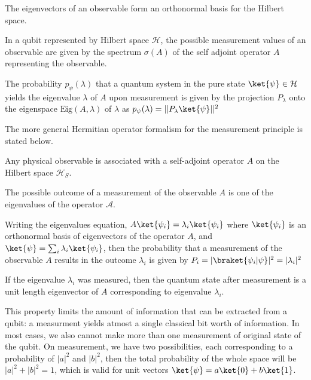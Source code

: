 \begin{lemma}
    The eigenvectors of an observable form an orthonormal basis for the Hilbert space.
\end{lemma}

\begin{lemma}
    In a qubit represented by Hilbert space $\mathcal{H}$, the possible measurement values of an observable are given by the spectrum $\sigma(A)$ of the self adjoint operator $A$ representing the observable.

    The probability $p_\psi(\lambda)$ that a quantum system in the pure state $\ket{\psi} \in \mathcal{H}$ yields the eigenvalue $\lambda$ of $A$ upon measurement is given by the projection $P_\lambda$ onto the eigenspace $\text{Eig}(A, \lambda)$ of $\lambda$ as $p_\psi(\lambda) = || P_\lambda \ket{\psi} ||^2$
\end{lemma}

The more general Hermitian operator formalism for the measurement principle is stated below.

\begin{mdframed}
\begin{axiom}
Any physical observable is associated with a self-adjoint operator $A$ on the Hilbert space $\mathcal{H}_S$. 

The possible outcome of a measurement of the observable $A$ is one of the eigenvalues of the operator $\mathcal{A}$.

Writing the eigenvalues equation, $A \ket{\psi_i} = \lambda_i \ket{\psi_i}$ where $\ket{\psi_i}$ is an orthonormal basis of eigenvectors of the operator $A$, and  $\ket{\psi} = \sum_i \lambda_i \ket{\psi_i}$,  then the probability that a measurement of the observable $A$ results in the outcome $\lambda_i$ is given by $P_i = |\braket{\psi_i|\psi}|^2 = |\lambda_i|^2$

If the eigenvalue $\lambda_i$ was measured, then the quantum state after measurement is a unit length eigenvector of $A$ corresponding to eigenvalue $\lambda_i$.
\end{axiom}
\end{mdframed}


This property limits the amount of information that can be extracted from a qubit: a measurment yields atmost a single classical bit worth of information. In most cases, we also cannot make more than one measurement of original state of the qubit. On measurement, we have two possibilities, each corresponding to a probability of $|a|^2$ and $|b|^2$, then the total probability of the whole space will be $|a|^2 + |b|^2 = 1$, which is valid for unit vectors $\ket{\psi} = a \ket{0} + b \ket{1}$.
